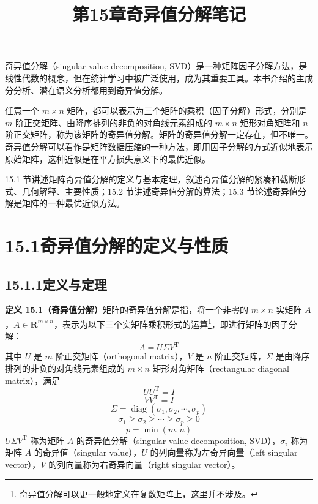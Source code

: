 \documentclass[UTF8,12pt,a4paper,fontset=fandol]{ctexart}
\title{第15章\quad 奇异值分解笔记}
\author{}
\date{}
\begin{document}
\maketitle

奇异值分解（singular value decomposition, SVD）是一种矩阵因子分解方法，是线性代数的概念，但在统计学习中被广泛使用，成为其重要工具。本书介绍的主成分分析、潜在语义分析都用到奇异值分解。

任意一个 $m\times n$ 矩阵，都可以表示为三个矩阵的乘积（因子分解）形式，分别是 $m$ 阶正交矩阵、由降序排列的非负的对角线元素组成的 $m\times n$ 矩形对角矩阵和 $n$ 阶正交矩阵，称为该矩阵的奇异值分解。矩阵的奇异值分解一定存在，但不唯一。奇异值分解可以看作是矩阵数据压缩的一种方法，即用因子分解的方式近似地表示原始矩阵，这种近似是在平方损失意义下的最优近似。

15.1 节讲述矩阵奇异值分解的定义与基本定理，叙述奇异值分解的紧凑和截断形式、几何解释、主要性质；15.2 节讲述奇异值分解的算法；15.3 节论述奇异值分解是矩阵的一种最优近似方法。

\section*{15.1\quad 奇异值分解的定义与性质}

\subsection*{15.1.1\quad 定义与定理}

\noindent\textbf{定义 15.1（奇异值分解）}\quad 矩阵的奇异值分解是指，将一个非零的 $m\times n$ 实矩阵 $A$，$A\in\mathbf{R}^{m\times n}$，表示为以下三个实矩阵乘积形式的运算\footnote{奇异值分解可以更一般地定义在复数矩阵上，这里并不涉及。}，即进行矩阵的因子分解：
\begin{equation}
A=U\Sigma V^{\mathrm{T}}
\tag{15.1}
\end{equation}
其中 $U$ 是 $m$ 阶正交矩阵（orthogonal matrix），$V$ 是 $n$ 阶正交矩阵，$\Sigma$ 是由降序排列的非负的对角线元素组成的 $m\times n$ 矩形对角矩阵（rectangular diagonal matrix），满足
\[
UU^{\mathrm{T}}=I
\]
\[
VV^{\mathrm{T}}=I
\]
\[
\Sigma=\operatorname{diag}(\sigma_1,\sigma_2,\cdots,\sigma_p)
\]
\[
\sigma_1\geqslant\sigma_2\geqslant\cdots\geqslant\sigma_p\geqslant0
\]
\[
p=\min(m,n)
\]
$U\Sigma V^{\mathrm{T}}$ 称为矩阵 $A$ 的奇异值分解（singular value decomposition, SVD），$\sigma_i$ 称为矩阵 $A$ 的奇异值（singular value），$U$ 的列向量称为左奇异向量（left singular vector），$V$ 的列向量称为右奇异向量（right singular vector）。
\end{document}
